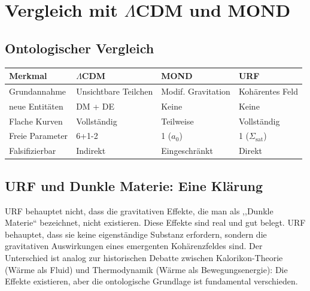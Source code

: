 \documentclass[12pt,a4paper]{article}
\theoremstyle{definition}
\begin{document}
\section{Vergleich mit $\Lambda$CDM und MOND}
\label{sec:vergleich}

\subsection{Ontologischer Vergleich}

\begin{center}
\begin{tabular}{p{3cm}p{3.5cm}p{3.5cm}p{3.5cm}}
\toprule
Merkmal & $\Lambda$CDM & MOND & URF \\
\midrule
Grundannahme & Unsichtbare Teilchen & Modif. Gravitation & Kohärentes Feld \\
neue Entitäten & DM + DE & Keine & Keine \\
Flache Kurven & Vollständig & Teilweise & Vollständig \\
Freie Parameter & 6+1-2 & 1 ($a_0$) & 1 ($\Sigma_{\mathrm{sat}}$) \\
Falsifizierbar & Indirekt & Eingeschränkt & Direkt \\
\bottomrule
\end{tabular}
\end{center}

\subsection{URF und Dunkle Materie: Eine Klärung}

URF behauptet nicht, dass die gravitativen Effekte, die man als
,,Dunkle Materie`` bezeichnet, nicht existieren. Diese Effekte sind
real und gut belegt. URF behauptet, dass sie keine eigenständige
Substanz erfordern, sondern die gravitativen Auswirkungen eines
emergenten Kohärenzfeldes sind. Der Unterschied ist analog zur
historischen Debatte zwischen Kalorikon-Theorie (Wärme als Fluid)
und Thermodynamik (Wärme als Bewegungsenergie): Die Effekte
existieren, aber die ontologische Grundlage ist fundamental verschieden.

%
%
\end{document}

